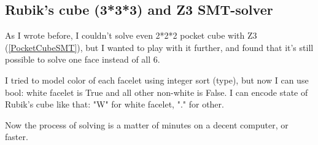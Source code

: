 \subsection{Rubik’s cube (3*3*3) and Z3 SMT-solver}

As I wrote before, I couldn't solve even 2*2*2 pocket cube with Z3 (\ref{PocketCubeSMT}),
but I wanted to play with it further, and found
that it's still possible to solve one face instead of all 6.

I tried to model color of each facelet using integer sort (type), but now I can use bool: white facelet is True and all other non-white is False.
I can encode state of Rubik's cube like that: "W" for white facelet, "." for other.

Now the process of solving is a matter of minutes on a decent computer, or faster.

